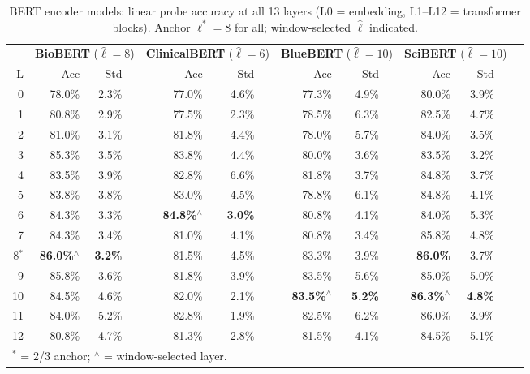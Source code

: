 \documentclass[11pt,a4paper]{article}
\begin{document}
\begin{table}[ht]
\centering
\caption{BERT encoder models: linear probe accuracy at all 13 layers
  (L0 = embedding, L1--L12 = transformer blocks).
  Anchor $\ell^*=8$ for all; window-selected $\hat{\ell}$ indicated.}
\label{tab:probe_encoders}
\small
\begin{tabular}{rrrrrrrrrrrrrr}
\toprule
 & \multicolumn{3}{c}{\textbf{BioBERT} ($\hat{\ell}=8$)}
 & \multicolumn{3}{c}{\textbf{ClinicalBERT} ($\hat{\ell}=6$)}
 & \multicolumn{3}{c}{\textbf{BlueBERT} ($\hat{\ell}=10$)}
 & \multicolumn{3}{c}{\textbf{SciBERT} ($\hat{\ell}=10$)} \\
\cmidrule(lr){2-4}\cmidrule(lr){5-7}\cmidrule(lr){8-10}\cmidrule(lr){11-13}
L & Acc & Std & & Acc & Std & & Acc & Std & & Acc & Std & \\
\midrule
0  & 78.0\% & 2.3\% && 77.0\% & 4.6\% && 77.3\% & 4.9\% && 80.0\% & 3.9\% \\
1  & 80.8\% & 2.9\% && 77.5\% & 2.3\% && 78.5\% & 6.3\% && 82.5\% & 4.7\% \\
2  & 81.0\% & 3.1\% && 81.8\% & 4.4\% && 78.0\% & 5.7\% && 84.0\% & 3.5\% \\
3  & 85.3\% & 3.5\% && 83.8\% & 4.4\% && 80.0\% & 3.6\% && 83.5\% & 3.2\% \\
4  & 83.5\% & 3.9\% && 82.8\% & 6.6\% && 81.8\% & 3.7\% && 84.8\% & 3.7\% \\
5  & 83.8\% & 3.8\% && 83.0\% & 4.5\% && 78.8\% & 6.1\% && 84.8\% & 4.1\% \\
6  & 84.3\% & 3.3\% && \textbf{84.8\%}$^\wedge$ & \textbf{3.0\%} && 80.8\% & 4.1\% && 84.0\% & 5.3\% \\
7  & 84.3\% & 3.4\% && 81.0\% & 4.1\% && 80.8\% & 3.4\% && 85.8\% & 4.8\% \\
8$^*$& \textbf{86.0\%}$^\wedge$ & \textbf{3.2\%} && 81.5\% & 4.5\% && 83.3\% & 3.9\% && \textbf{86.0\%} & 3.7\% \\
9  & 85.8\% & 3.6\% && 81.8\% & 3.9\% && 83.5\% & 5.6\% && 85.0\% & 5.0\% \\
10 & 84.5\% & 4.6\% && 82.0\% & 2.1\% && \textbf{83.5\%}$^\wedge$ & \textbf{5.2\%} && \textbf{86.3\%}$^\wedge$ & \textbf{4.8\%} \\
11 & 84.0\% & 5.2\% && 82.8\% & 1.9\% && 82.5\% & 6.2\% && 86.0\% & 3.9\% \\
12 & 80.8\% & 4.7\% && 81.3\% & 2.8\% && 81.5\% & 4.1\% && 84.5\% & 5.1\% \\
\bottomrule
\multicolumn{13}{l}{\small $^*$ = 2/3 anchor; $^\wedge$ = window-selected layer.}
\end{tabular}
\end{table}
\end{document}
